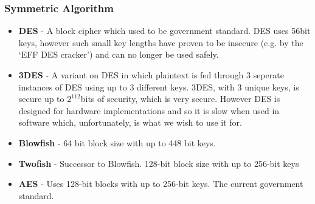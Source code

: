 \documentclass[12pt, titlepage]{article}
\begin{document}
\subsubsection{Symmetric Algorithm}
\begin{itemize}
	\item \textbf{DES} - A block cipher which used to be government standard. DES uses 56bit keys, however such small key lengths have proven to be insecure (e.g. by the `EFF DES cracker') and can no longer be used safely.
	\item \textbf{3DES} - A variant on DES in which plaintext is fed through 3 seperate instances of DES using up to 3 different keys. 3DES, with 3 unique keys, is secure up to $2^112$bits of security, which is very secure. However DES is designed for hardware implementations and so it is slow when used in software which, unfortunately, is what we wish to use it for.
	\item \textbf{Blowfish} - 64 bit block size with up to 448 bit keys.
	\item \textbf{Twofish} - Successor to Blowfish. 128-bit block size with up to 256-bit keys
	\item \textbf{AES} - Uses 128-bit blocks with up to 256-bit keys. The current government standard.
\end{itemize}
\end{document}
